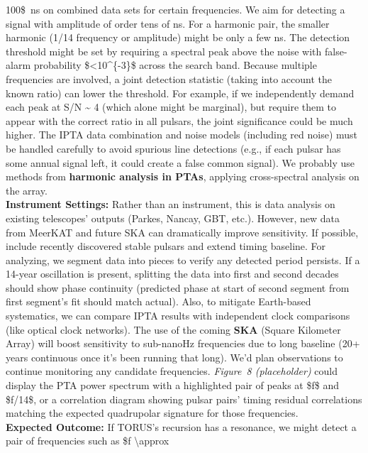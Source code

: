 \documentclass[]{article}
\begin{document}
\begin{enumerate}
  100\$~ns on combined data sets for certain frequencies. We aim for
  detecting a signal with amplitude of order tens of ns. For a harmonic
  pair, the smaller harmonic (1/14 frequency or amplitude) might be only
  a few ns. The detection threshold might be set by requiring a spectral
  peak above the noise with false-alarm probability
  \$\textless{}10\^{}\{-3\}\$ across the search band. Because multiple
  frequencies are involved, a joint detection statistic (taking into
  account the known ratio) can lower the threshold. For example, if we
  independently demand each peak at S/N \textasciitilde{} 4 (which alone
  might be marginal), but require them to appear with the correct ratio
  in all pulsars, the joint significance could be much higher. The IPTA
  data combination and noise models (including red noise) must be
  handled carefully to avoid spurious line detections (e.g., if each
  pulsar has some annual signal left, it could create a false common
  signal). We probably use methods from \textbf{harmonic analysis in
  PTAs}​, applying cross-spectral analysis on the array.\\
  \textbf{Instrument Settings:} Rather than an instrument, this is data
  analysis on existing telescopes' outputs (Parkes, Nancay, GBT, etc.).
  However, new data from MeerKAT and future SKA can dramatically improve
  sensitivity. If possible, include recently discovered stable pulsars
  and extend timing baseline. For analyzing, we segment data into pieces
  to verify any detected period persists. If a 14-year oscillation is
  present, splitting the data into first and second decades should show
  phase continuity (predicted phase at start of second segment from
  first segment's fit should match actual). Also, to mitigate
  Earth-based systematics, we can compare IPTA results with independent
  clock comparisons (like optical clock networks). The use of the coming
  \textbf{SKA} (Square Kilometer Array) will boost sensitivity to
  sub-nanoHz frequencies due to long baseline (20+ years continuous once
  it's been running that long). We'd plan observations to continue
  monitoring any candidate frequencies. \emph{Figure~8 (placeholder)}
  could display the PTA power spectrum with a highlighted pair of peaks
  at \$f\$ and \$f/14\$, or a correlation diagram showing pulsar pairs'
  timing residual correlations matching the expected quadrupolar
  signature for those frequencies.\\
  \textbf{Expected Outcome:} If TORUS's recursion has a resonance, we
  might detect a pair of frequencies such as \$f \textbackslash{}approx

\end{enumerate}
\end{document}
